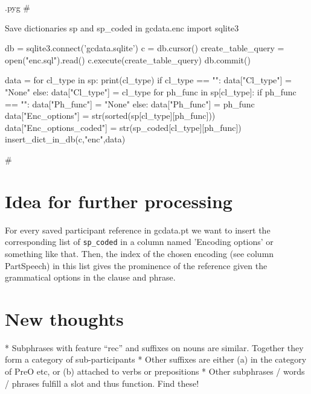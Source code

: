 \documentclass{report}
\makeatletter
\newcommand{\mi}[1]{\lstinline{#1}}
\newenvironment{python}{%
  \VerbatimEnvironment
  \minted@resetoptions
  \setkeys{minted@opt}{}
      \begin{VerbatimOut}{\jobname.pyg}}
{%
      \end{VerbatimOut}
      \minted@pygmentize{python}
      \DeleteFile{\jobname.pyg}}
\makeatother
\begin{document}
\begin{python}
#{{{ Save dictionaries sp and sp_coded in gcdata.enc
import sqlite3

db = sqlite3.connect('gcdata.sqlite')
c = db.cursor()
create_table_query = open("enc.sql").read()
c.execute(create_table_query)
db.commit()

data = {}
for cl_type in sp:
    print(cl_type)
    if cl_type == "":
        data["Cl_type"] = "None"
    else:
        data["Cl_type"] = cl_type
    for ph_func in sp[cl_type]:
        if ph_func == "":
            data["Ph_func"] = "None"
        else:
            data["Ph_func"] = ph_func
        data["Enc_options"] = str(sorted(sp[cl_type][ph_func]))
        data["Enc_options_coded"] = str(sp_coded[cl_type][ph_func])
        insert_dict_in_db(c,"enc",data)

#}}}
\end{python}

\section{Idea for further processing}
For every saved participant reference in gcdata.pt we want to insert the corresponding list of \mi{sp_coded} in a column named 'Encoding options' or something like that.
Then, the index of the chosen encoding (see column PartSpeech) in this list gives the prominence of the reference given the grammatical options in the clause and phrase.

\section{New thoughts}
* Subphrases with feature ``rec'' and suffixes on nouns are similar. Together they form a category of sub-participants
* Other suffixes are either (a) in the category of PreO etc, or (b) attached to verbs or prepositions
* Other subphrases / words / phrases fulfill a slot and thus function. Find these!
\end{document}
